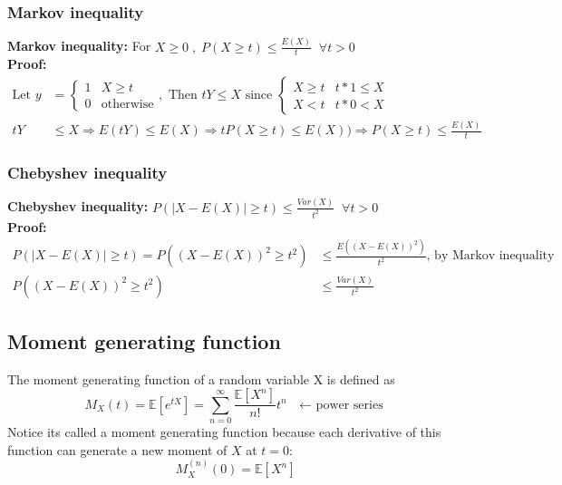 \documentclass{article}
\newcommand{\abs}[1]{\lvert#1\rvert}
\begin{document}
\subsubsection{Markov inequality}
\textbf{Markov inequality: } For $X\geq 0 \;, \;P(X \geq t) \leq \frac{E(X)}{t} \; \; \forall t>0$\\
\textbf{Proof: }
\begin{align*}
    \textrm{Let } y &= \begin{cases}
        1 & X \geq t\\
        0 & \textrm{otherwise}
    \end{cases}, \textrm{  Then } tY \leq X \textrm{ since } \begin{cases}
        X \geq t & t*1 \leq X \\
        X < t & t*0 < X
    \end{cases}\\
    tY &\leq X \Longrightarrow E(tY) \leq E(X) \Longrightarrow tP(X \geq t) \leq E(X)) \Longrightarrow P(X \geq t) \leq \frac{E(X)}{t}
\end{align*}

\subsubsection{Chebyshev inequality}
\textbf{Chebyshev inequality: } $P(\abs{X - E(X)} \geq t) \leq \frac{Var(X)}{t^2} \; \; \forall t > 0$\\
\textbf{Proof: }
\begin{align*}
    P(\abs{X - E(X)} \geq t) = P((X - E(X))^2 \geq t^2) &\leq \frac{E((X - E(X))^2)}{t^2} \textrm{, by Markov inequality}\\
    P((X - E(X))^2 \geq t^2) &\leq \frac{Var(X)}{t^2}
\end{align*}

\subsection{Moment generating function}
The moment generating function of a random variable X is defined as 
\begin{equation*}
	M_X(t) = \mathbb{E}[e^{tX}] = \sum_{n=0}^\infty\frac{\mathbb{E}[X^n]}{n!}t^n \textrm{ $\leftarrow$ power series}
\end{equation*}
Notice its called a moment generating function because each derivative of this function can generate a new moment of $X$ at $t=0$:
\begin{equation*}
	M_X^{(n)}(0) = \mathbb{E}[X^n]
\end{equation*}
\end{document}
